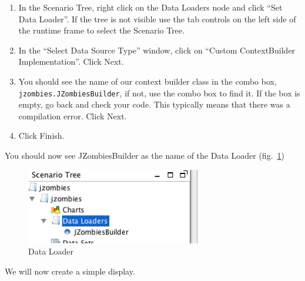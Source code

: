 \documentclass[11pt]{amsart}
\begin{document}
\vspace{.2in}
\begin{enumerate}
\item In the Scenario Tree, right click on the Data Loaders node and click ``Set Data Loader''. If the 
tree is not visible use the tab controls on the left side of the runtime frame to select the Scenario Tree.
\item In the ``Select Data Source Type'' window, click on ``Custom ContextBuilder Implementation''. Click Next.
\item You should see the name of our context builder class in the combo box,\\ \texttt{jzombies.JZombiesBuilder}, if
not,  use the combo box to find it. If the box is empty, go back and check your code. This typically means that there was a compilation error. Click Next.
\item Click Finish.
\end{enumerate}
\vspace{.2in}

You should now see JZombiesBuilder as the name of the Data Loader (fig.~\ref{fig:dl})

\begin{figure}[h]
\begin{center}
\vspace{.2in}
\centerline {
\includegraphics[width=3in]{GettingStartedImages/data_loader.png}
}
\caption{Data Loader}
\label{fig:dl}
\end{center}
\end{figure}

We will now create a simple display. 
\end{document}
